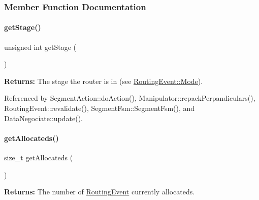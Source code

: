 \subsubsection{Member Function Documentation}
\mbox{\label{classKite_1_1RoutingEvent_a110307ff26b264ea83f69aa1bab23626}} 
\paragraph{\texorpdfstring{get\+Stage()}{getStage()}}
{\footnotesize\ttfamily unsigned int get\+Stage (\begin{DoxyParamCaption}{ }\end{DoxyParamCaption})\hspace{0.3cm}{\ttfamily [static]}}

{\bfseries Returns\+:} The stage the router is in (see \hyperlink{classKite_1_1RoutingEvent_a46c8a310cf4c094f8c80e1cb8dc1f911}{Routing\+Event\+::\+Mode}). 

Referenced by Segment\+Action\+::do\+Action(), Manipulator\+::repack\+Perpandiculars(), Routing\+Event\+::revalidate(), Segment\+Fsm\+::\+Segment\+Fsm(), and Data\+Negociate\+::update().

\mbox{\label{classKite_1_1RoutingEvent_a91c8bc1a6bdb1b15c3c084ebfd38af47}} 
\paragraph{\texorpdfstring{get\+Allocateds()}{getAllocateds()}}
{\footnotesize\ttfamily size\+\_\+t get\+Allocateds (\begin{DoxyParamCaption}{ }\end{DoxyParamCaption})\hspace{0.3cm}{\ttfamily [static]}}

{\bfseries Returns\+:} The number of \hyperlink{classKite_1_1RoutingEvent}{Routing\+Event} currently allocateds. \mbox{\label{classKite_1_1RoutingEvent_a0a3993330692b7eb816e9c776d161ad1}} 
